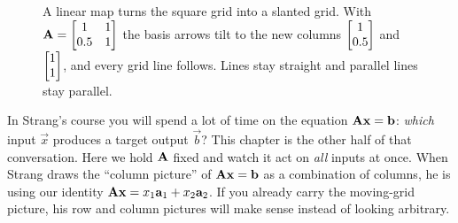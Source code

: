 \begin{figure}[H]
\centering
{}
\caption{A linear map turns the square grid into a slanted grid. With
$\mathbf{A}=\protect\begin{bmatrix}1 & 1\\ 0.5 & 1\protect\end{bmatrix}$ the basis
arrows tilt to the new columns $\protect\begin{bmatrix}1\\0.5\end{bmatrix}$ and $\protect\begin{bmatrix}1\\1\end{bmatrix}$,
and every grid line follows. Lines stay straight and parallel lines stay
parallel.}
\label{ch05:fig-grid}
\end{figure}

\begin{strangbox}
In Strang's course you will spend a lot of time on the equation
$\mathbf{A}\mathbf{x} = \mathbf{b}$: \emph{which} input $\vec{x}$ produces a target output
$\vec{b}$? This chapter is the other half of that conversation. Here we hold
$\mathbf{A}$ fixed and watch it act on \emph{all} inputs at once. When Strang draws
the ``column picture'' of $\mathbf{A}\mathbf{x} = \mathbf{b}$ as a
combination of columns, he is using our identity $\mathbf{A}\mathbf{x} = x_1
\mathbf{a}_1 + x_2 \mathbf{a}_2$. If you already carry the moving-grid picture, his
row and column pictures will make sense instead of looking arbitrary.
\end{strangbox}

